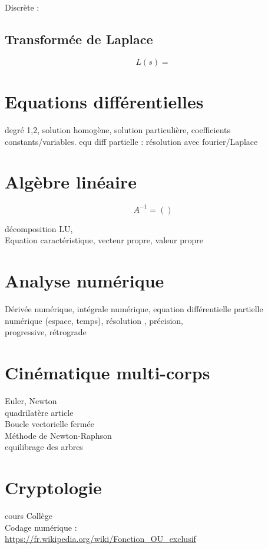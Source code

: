 Discrète : 

\subsection{Transformée de Laplace}
\begin{equation}
	L(s)=
\end{equation}
\newpage
\section{Equations différentielles}
degré 1,2, solution homogène, solution particulière,
coefficients constants/variables. 
equ diff partielle : résolution avec fourier/Laplace

\newpage
\section{Algèbre linéaire}
\begin{equation}
A^{-1}=()
\end{equation}

décomposition LU, \\
Equation caractéristique, vecteur propre, valeur propre

\newpage
\section{Analyse numérique}

Dérivée numérique, intégrale numérique, equation différentielle partielle numérique (espace, temps), résolution , précision, \\

progressive, rétrograde

\newpage
\section{Cinématique multi-corps}
Euler, Newton\\
quadrilatère article\\
Boucle vectorielle fermée\\
Méthode de Newton-Raphson\\
equilibrage des arbres\\
\newpage

\newpage
\section{Cryptologie}
cours Collège\\
Codage numérique :\\
\url{https://fr.wikipedia.org/wiki/Fonction_OU_exclusif}\\

